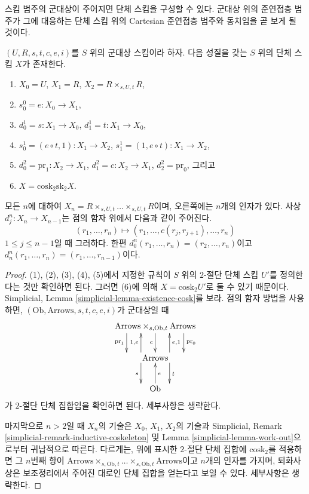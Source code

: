 \noindent
스킴 범주의 군대상이 주어지면 단체 스킴을 구성할 수 있다.
군대상 위의 준연접층 범주가 그에 대응하는 단체 스킴 위의
Cartesian 준연접층 범주와 동치임을 곧 보게 될 것이다.

\begin{lemma}
\label{lemma-groupoid-simplicial}
$(U, R, s, t, c, e, i)$를 $S$ 위의 군대상 스킴이라 하자.
다음 성질을 갖는 $S$ 위의 단체 스킴 $X$가 존재한다.
\begin{enumerate}
\item $X_0 = U$, $X_1 = R$, $X_2 = R \times_{s, U, t} R$,
\item $s_0^0 = e : X_0 \to X_1$,
\item $d^1_0 = s : X_1 \to X_0$, $d^1_1 = t : X_1 \to X_0$,
\item $s_0^1 = (e \circ t, 1) : X_1 \to X_2$,
$s_1^1 = (1, e \circ t) : X_1 \to X_2$,
\item $d^2_0 = \text{pr}_1 : X_2 \to X_1$,
$d^2_1 = c : X_2 \to X_1$,
$d^2_2 = \text{pr}_0$, 그리고
\item $X = \text{cosk}_2 \text{sk}_2 X$.
\end{enumerate}
모든 $n$에 대하여
$X_n = R \times_{s, U, t} \ldots \times_{s, U, t} R$이며,
오른쪽에는 $n$개의 인자가 있다. 사상 $d^n_j : X_n \to X_{n - 1}$는
점의 함자 위에서 다음과 같이 주어진다.
$$
(r_1, \ldots, r_n) \longmapsto (r_1, \ldots, c(r_j, r_{j + 1}), \ldots, r_n)
$$
$1 \leq j \leq n - 1$일 때 그러하다. 한편
$d^n_0(r_1, \ldots, r_n) = (r_2, \ldots, r_n)$이고
$d^n_n(r_1, \ldots, r_n) = (r_1, \ldots, r_{n - 1})$이다.
\end{lemma}

\begin{proof}
(1), (2), (3), (4), (5)에서 지정한 규칙이 $S$ 위의
$2$-절단 단체 스킴 $U'$를 정의한다는 것만 확인하면 된다.
그러면 (6)에 의해 $X = \text{cosk}_2 U'$로 둘 수 있기 때문이다.
Simplicial, Lemma \ref{simplicial-lemma-existence-cosk}를 보라.
점의 함자 방법을 사용하면, $(\text{Ob}, \text{Arrows}, s, t, c, e, i)$가
군대상일 때
$$
\xymatrix{
\text{Arrows} \times_{s, \text{Ob}, t} \text{Arrows}
\ar@<8ex>[d]^{\text{pr}_0}
\ar@<0ex>[d]_c
\ar@<-8ex>[d]_{\text{pr}_1}
\\
\text{Arrows}
\ar@<4ex>[d]^t
\ar@<-4ex>[d]_s
\ar@<4ex>[u]^{1, e}
\ar@<-4ex>[u]_{e, 1}
\\
\text{Ob}
\ar@<0ex>[u]_e
}
$$
가 $2$-절단 단체 집합임을 확인하면 된다. 세부사항은 생략한다.

\medskip\noindent
마지막으로 $n > 2$일 때 $X_n$의 기술은 $X_0$, $X_1$, $X_2$의
기술과 Simplicial, Remark
\ref{simplicial-remark-inductive-coskeleton} 및 Lemma
\ref{simplicial-lemma-work-out}으로부터 귀납적으로 따른다.
다르게는, 위에 표시한 $2$-절단 단체 집합에
$\text{cosk}_2$를 적용하면 그 $n$번째 항이
$\text{Arrows} \times_{s, \text{Ob}, t} \ldots \times_{s, \text{Ob}, t}
\text{Arrows}$이고 $n$개의 인자를 가지며, 퇴화사상은 보조정리에서
주어진 대로인 단체 집합을 얻는다고 보일 수 있다.
세부사항은 생략한다.
\end{proof}

